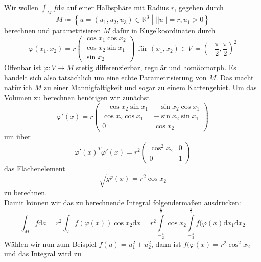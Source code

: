 \begin{beispiel}
Wir wollen $\int_Mf\mathrm{d}a$ auf einer Halbsphäre mit Radius $r$, 
gegeben durch
\begin{equation*}
	M\coloneqq\left\{u=(u_1,u_2,u_3)\in\mathbb{R}^3\middle| ||u||=r, u_1>0\right\}
\end{equation*}
berechnen und parametrisieren $M$ dafür in Kugelkoordinaten durch
\begin{equation*}
	\varphi(x_1,x_2)=r\begin{pmatrix}
	\cos x_1 \cos x_2 \\ \cos x_2 \sin x_1 \\ \sin x_2
	\end{pmatrix}
	\ \ \text{für\ } (x_1,x_2)\in V\coloneqq \left(-\frac{\pi}{2},\frac{\pi}{2}\right)^2
\end{equation*}
Offenbar ist $\varphi:V\rightarrow M$ stetig differenzierbar, regulär und homöomorph. 
Es handelt sich also tatsächlich um eine echte Parametrisierung von $M$. 
Das macht natürlich $M$ zu einer Mannigfaltigkeit und sogar zu einem Kartengebiet.
Um das Volumen zu berechnen benötigen wir zunächst
\begin{equation*}
	\varphi'(x)=r\begin{pmatrix}
	-\cos x_2 \sin x_1 & -\sin x_2 \cos x_1 \\
	 \cos x_2 \cos x_1 & -\sin x_2 \sin x_1 \\
	 0 & \cos x_2
	\end{pmatrix}
\end{equation*}
um über 
\begin{equation*}
	\varphi'(x)^T\varphi'(x)=r^2\begin{pmatrix}
	\cos^2 x_2 & 0 \\ 0 & 1 
	\end{pmatrix}
\end{equation*}
das Flächenelement
\begin{equation*}
	\sqrt{g^\varphi(x)}=r^2\cos x_2
\end{equation*}
zu berechnen.\\
Damit können wir das zu berechnende Integral folgendermaßen ausdrücken:
\begin{equation*}
	\int_Mf\mathrm{d}a = r^2\int_Vf(\varphi(x))\cos x_2\mathrm{d}x = 
	r^2\int\limits_{-\frac{\pi}{2}}^{\frac{\pi}{2}}\cos x_2\int\limits_{-\frac{\pi}{2}}^{\frac{\pi}{2}}f(\varphi(x)\mathrm{d}x_1\mathrm{d}x_2 
\end{equation*}
Wählen wir nun zum Beispiel $f(u)=u_1^2+u_2^2$, dann ist $f(\varphi(x)=r^2\cos^2 x_2$ und das Integral wird zu

\end{beispiel}
